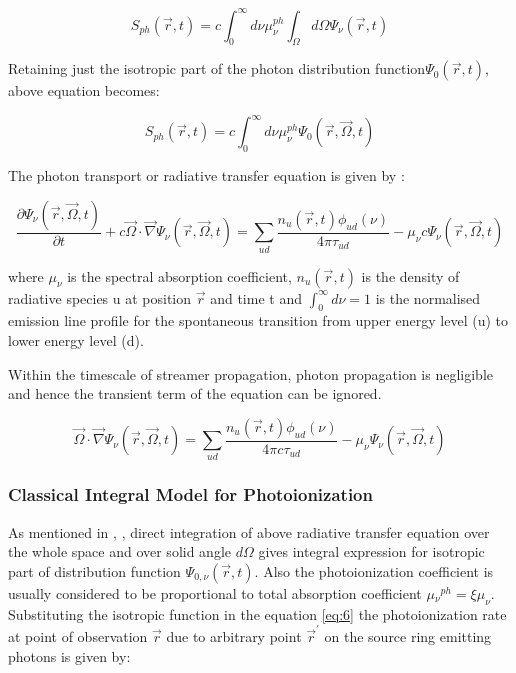 \documentclass{article}
\begin{document}
\begin{equation}
S_{ph} (\vec{r},t) = c\int_{0}^{\infty}d\nu \mu_{\nu}^{ph}  \int_{\Omega}d\Omega\Psi_\nu(\vec{r},t)
\end{equation}

Retaining just the isotropic part of the photon distribution function$\Psi_0(\vec{r},t)$, above equation becomes:

\begin{equation} \label{eq:6}
S_{ph} (\vec{r},t) = c\int_{0}^{\infty}d\nu \mu_{\nu}^{ph}  \Psi_0(\vec{r},\vec{\Omega},t)
\end{equation}

The photon transport or radiative transfer equation is given by :

\begin{equation}
\frac{\partial\Psi_\nu(\vec{r},\vec{\Omega},t)}{\partial t} + c\vec{\Omega} \cdot \vec{\nabla} \Psi_\nu(\vec{r},\vec{\Omega},t) = \sum_{ud} \frac{n_u (\vec{r},t)\phi_{ud} (\nu)}{4 \pi \tau_{ud}} - \mu_\nu c \Psi_\nu(\vec{r},\vec{\Omega},t)
\end{equation}

where $\mu_\nu$ is the spectral absorption coefficient, $n_u(\vec{r},t)$ is the density of radiative species u at position $\vec{r}$ and time t and $\int_{0}^{\infty}d\nu = 1$ is the normalised emission line profile for the spontaneous transition from upper energy level (u) to lower energy level (d). 

Within the timescale of streamer propagation, photon propagation is negligible and hence the transient term of the equation can be ignored. 

\begin{equation}
\vec{\Omega} \cdot \vec{\nabla} \Psi_\nu(\vec{r},\vec{\Omega},t) = \sum_{ud} \frac{n_u (\vec{r},t)\phi_{ud} (\nu)}{4 \pi c \tau_{ud}} - \mu_\nu \Psi_\nu(\vec{r},\vec{\Omega},t)
\end{equation}

\subsubsection{Classical Integral Model for Photoionization}

As mentioned in \cite{Bourdon2007EfficientEquations}, \cite{ZhelezniakM.B.andMnatsakanianA.K.andSizykh1982PhotoionizationDischarge}, direct integration of above radiative transfer equation over the whole space and over solid angle $d\Omega$ gives integral expression for isotropic part of distribution function $\Psi_{0,\nu}(\vec{r},t)$. Also the photoionization coefficient is usually considered to be proportional to total absorption coefficient $\mu{_\nu}^{ph}= \xi \mu_\nu$. Substituting the isotropic function in the equation \ref{eq:6} the photoionization rate at point of observation $\vec{r}$ due to arbitrary point $\vec{r}^'$ on the source ring emitting photons is given by:
\end{document}
